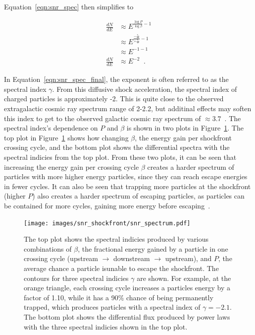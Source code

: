   Equation~\ref{eqn:snr_spec} then simplifies to
  
  \begin{equation}\label{eqn:snr_spec_final}
    \begin{split}
      \frac{dN}{dE} & \approx E^{ \frac{\log P}{\log \beta} - 1 } \\
                    & \approx E^{ \frac{ -\frac{v_s}{c} }{ +\frac{v_s}{c} } - 1 } \\
                    & \approx E^{ -1 - 1 } \\
      \frac{dN}{dE} & \approx E^{ -2 } \;\; .
    \end{split}
  \end{equation}

  In Equation~\ref{eqn:snr_spec_final}, the exponent is often referred to as the spectral index $\gamma$.
  From this diffusive shock acceleration, the spectral index of charged particles is approximately -2.
  This is quite close to the observed extragalactic cosmic ray spectrum range of 2-2.2, but additinal effects may soften this index to get to the observed galactic cosmic ray spectrum of $\approx{}3.7$~\cite{cosmicrayspectrumorigin}.
  The spectral index's dependence on $P$ and $\beta$ is shown in two plots in Figure~\ref{fig:snr_spectrum}.
  The top plot in Figure~\ref{fig:snr_spectrum} shows how changing $\beta$, the energy gain per shockfront crossing cycle, and the bottom plot shows the differential spectra with the spectral indicies from the top plot.
  From these two plots, it can be seen that increasing the energy gain per crossing cycle $\beta$ creates a harder spectrum of particles with more higher energy particles, since they can reach escape energies in fewer cycles.
  It can also be seen that trapping more particles at the shockfront (higher $P$) also creates a harder spectrum of escaping particles, as particles can be contained for more cycles, gaining more energy before escaping~\cite{dsa6}.

  \begin{figure}[ht]
    \centering
    \texttt{[image: images/snr\_shockfront/snr\_spectrum.pdf]}
    \caption[Supernova Diffuse Acceleration Spectral Indicies]{
      The top plot shows the spectral indicies produced by various combinations of $\beta$, the fractional energy gained by a particle in one crossing cycle (upstream $\rightarrow$ downstream $\rightarrow$ upstream), and $P$, the average chance a particle isunable to escape the shockfront.
      The contours for three spectral indicies $\gamma$ are shown.
      For example, at the orange triangle, each crossing cycle increases a particles energy by a factor of 1.10, while it has a 90\% chance of being permanently trapped, which produces particles with a spectral index of $\gamma=-2.1$.
      The bottom plot shows the differential flux produced by power laws with the three spectral indicies shown in the top plot.
    }\label{fig:snr_spectrum}
  \end{figure}
  
